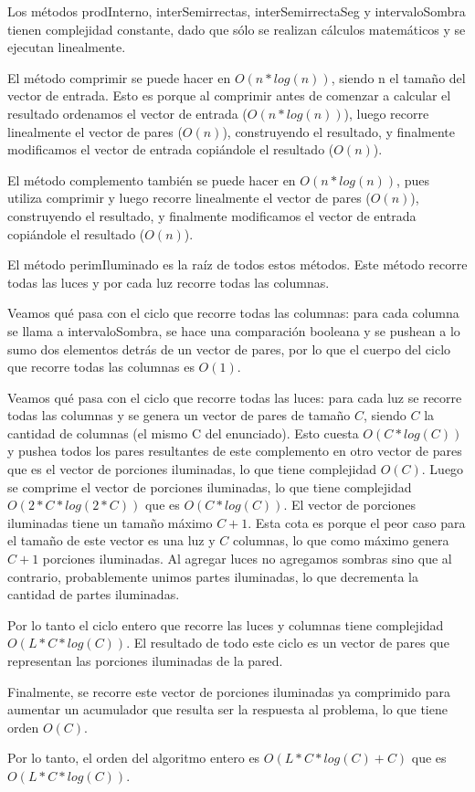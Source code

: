 Los métodos prodInterno, interSemirrectas, interSemirrectaSeg y intervaloSombra tienen complejidad 
constante, dado que sólo se realizan cálculos matemáticos y se ejecutan linealmente.

El método comprimir se puede hacer en $O(n*log(n))$, siendo n el tamaño del vector de entrada. Esto 
es porque al comprimir antes de comenzar a calcular el resultado ordenamos el vector de entrada 
($O(n*log(n))$), luego recorre linealmente el vector de pares ($O(n)$), construyendo el resultado, 
y finalmente modificamos el vector de entrada copiándole el resultado ($O(n)$).

El método complemento también se puede hacer en $O(n*log(n))$, pues utiliza comprimir y luego recorre 
linealmente el vector de pares ($O(n)$), construyendo el resultado, y finalmente modificamos el vector 
de entrada copiándole el resultado ($O(n)$).

El método perimIluminado es la raíz de todos estos métodos. Este método recorre todas las luces y 
por cada luz recorre todas las columnas.

Veamos qué pasa con el ciclo que recorre todas las columnas: para cada columna se llama a 
intervaloSombra, se hace una comparación booleana y se pushean a lo sumo dos elementos detrás de un 
vector de pares, por lo que el cuerpo del ciclo que recorre todas las columnas es $O(1)$.

Veamos qué pasa con el ciclo que recorre todas las luces: para cada luz se recorre todas las columnas 
y se genera un vector de pares de tamaño $C$, siendo $C$ la cantidad de columnas (el mismo C del 
enunciado). Esto cuesta $O(C*log(C))$ y pushea todos los pares resultantes de este complemento en otro 
vector de pares que es el vector de porciones iluminadas, lo que tiene complejidad $O(C)$.
Luego se comprime el vector de porciones iluminadas, lo que tiene complejidad $O(2*C*log(2*C))$ que es
$O(C*log(C))$. El vector de porciones iluminadas tiene un tamaño máximo $C+1$. Esta cota es porque el
peor caso para el tamaño de este vector es una luz y $C$ columnas, lo que como máximo genera $C+1$ 
porciones iluminadas. Al agregar luces no agregamos sombras sino que al contrario, probablemente unimos 
partes iluminadas, lo que decrementa la cantidad de partes iluminadas.

Por lo tanto el ciclo entero que recorre las luces y columnas tiene complejidad $O(L*C*log(C))$. El 
resultado de todo este ciclo es un vector de pares que representan las porciones iluminadas de la pared.

Finalmente, se recorre este vector de porciones iluminadas ya comprimido para aumentar un acumulador que 
resulta ser la respuesta al problema, lo que tiene orden $O(C)$.

Por lo tanto, el orden del algoritmo entero es $O(L*C*log(C) + C)$ que es $O(L*C*log(C))$.